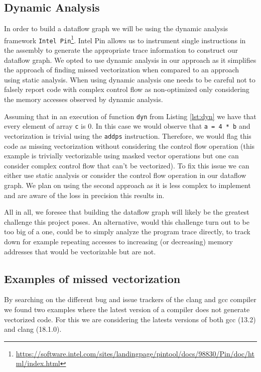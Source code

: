 \documentclass[acmsmall,review, nonacm]{acmart}
\begin{document}
\subsection{Dynamic Analysis}
In order to build a dataflow graph we will be using the dynamic analysis framework 
\texttt{Intel Pin}\footnote{\url{https://software.intel.com/sites/landingpage/pintool/docs/98830/Pin/doc/html/index.html}}.
Intel Pin allows us to instrument single instructions in the assembly to generate 
the appropriate trace information to construct our dataflow graph. 
We opted to use dynamic analysis in our approach as it simplifies the approach of finding missed vectorization when 
compared to an approach using static analysis. 
When using dynamic analysis one needs to be careful not to falsely report code with 
complex control flow as non-optimized only considering the memory accesses 
observed by dynamic analysis.

Assuming that in an execution of function \texttt{dyn} from Listing \ref{lst:dyn} 
we have that every element of array \texttt{c} is 0. In this case we would 
observe that \texttt{a = 4 * b} and vectorization is trivial using the \texttt{addps} instruction.
Therefore, we would flag this code as missing vectorization without considering 
the control flow operation (this example is trivially vectorizable using masked 
vector operations but one can consider complex control flow that can't be vectorized). 
To fix this issue we can either use static analysis or consider the control 
flow operation in our dataflow graph.
We plan on using the second approach as it is less complex to implement and are 
aware of the loss in precision this results in.


All in all, we foresee that building the dataflow graph will likely be the greatest challenge this project poses. An alternative,
would this challenge turn out to be too big of a one, could be to simply analyze the program trace directly, to track down for example repeating accesses
to increasing (or decreasing) memory addresses that would be vectorizable but are not.

\subsection{Examples of missed vectorization} \label{examples}
By searching on the different bug and issue trackers of the clang and gcc 
compiler we found two examples where the latest version of a compiler does not 
generate vectorized code. For this we are considering the latests versions of 
both gcc (13.2) and clang (18.1.0).
\end{document}
